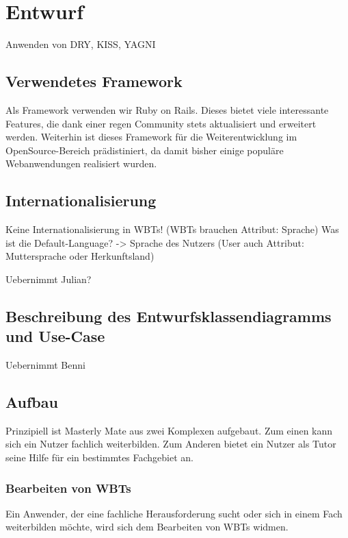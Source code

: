 \chapter{Entwurf}\label{ref:chaptScript}
\begin{k}
Anwenden von DRY, KISS, YAGNI
\end{k}
\section{Verwendetes Framework}
Als Framework verwenden wir Ruby on Rails. Dieses bietet viele interessante
Features, die dank einer regen Community stets aktualisiert und erweitert
werden. Weiterhin ist dieses Framework für die Weiterentwicklung im
OpenSource-Bereich prädistiniert, da damit bisher einige populäre Webanwendungen
realisiert wurden.

\section{Internationalisierung}\label{ref:internationalisierung}
\begin{k}
Keine Internationalisierung in WBTs! (WBTs brauchen Attribut: Sprache)
Was ist die Default-Language? -> Sprache des Nutzers (User auch Attribut:
Muttersprache oder Herkunftsland)

Uebernimmt Julian?
\end{k}

\section{Beschreibung des Entwurfsklassendiagramms und
Use-Case}\label{ref:classModel}
\begin{k}
Uebernimmt Benni
\end{k}

\section{Aufbau}
Prinzipiell ist Masterly Mate aus zwei Komplexen aufgebaut. Zum einen kann sich
ein Nutzer fachlich weiterbilden. Zum Anderen bietet ein Nutzer als Tutor seine
Hilfe für ein bestimmtes Fachgebiet an.

\subsection{Bearbeiten von WBTs}
Ein Anwender, der eine fachliche Herausforderung sucht oder sich in einem Fach
weiterbilden möchte, wird sich dem Bearbeiten von WBTs widmen.

